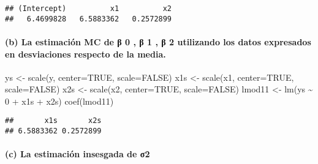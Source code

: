 \documentclass[
]{article}
\newenvironment{Shaded}{\begin{snugshade}}{\end{snugshade}}
\newcommand{\AttributeTok}[1]{\textcolor[rgb]{0.77,0.63,0.00}{#1}}
\newcommand{\ConstantTok}[1]{\textcolor[rgb]{0.00,0.00,0.00}{#1}}
\newcommand{\DecValTok}[1]{\textcolor[rgb]{0.00,0.00,0.81}{#1}}
\newcommand{\FunctionTok}[1]{\textcolor[rgb]{0.00,0.00,0.00}{#1}}
\newcommand{\NormalTok}[1]{#1}
\newcommand{\OtherTok}[1]{\textcolor[rgb]{0.56,0.35,0.01}{#1}}
\newcommand{\SpecialCharTok}[1]{\textcolor[rgb]{0.00,0.00,0.00}{#1}}
\begin{document}
\begin{verbatim}
## (Intercept)          x1          x2 
##   6.4699828   6.5883362   0.2572899
\end{verbatim}

\hypertarget{b-la-estimaciuxf3n-mc-de-ux3b2-0-ux3b2-1-ux3b2-2-utilizando-los-datos-expresados-en-desviaciones-respecto-de-la-media.}{%
\paragraph{(b) La estimación MC de β 0 , β 1 , β 2 utilizando los datos
expresados en desviaciones respecto de la
media.}\label{b-la-estimaciuxf3n-mc-de-ux3b2-0-ux3b2-1-ux3b2-2-utilizando-los-datos-expresados-en-desviaciones-respecto-de-la-media.}}

\begin{Shaded}
\begin{Highlighting}[]
\NormalTok{ys }\OtherTok{\textless{}{-}} \FunctionTok{scale}\NormalTok{(y, }\AttributeTok{center=}\ConstantTok{TRUE}\NormalTok{, }\AttributeTok{scale=}\ConstantTok{FALSE}\NormalTok{)}
\NormalTok{x1s }\OtherTok{\textless{}{-}} \FunctionTok{scale}\NormalTok{(x1, }\AttributeTok{center=}\ConstantTok{TRUE}\NormalTok{, }\AttributeTok{scale=}\ConstantTok{FALSE}\NormalTok{)}
\NormalTok{x2s }\OtherTok{\textless{}{-}} \FunctionTok{scale}\NormalTok{(x2, }\AttributeTok{center=}\ConstantTok{TRUE}\NormalTok{, }\AttributeTok{scale=}\ConstantTok{FALSE}\NormalTok{)}
\NormalTok{lmod11 }\OtherTok{\textless{}{-}} \FunctionTok{lm}\NormalTok{(ys }\SpecialCharTok{\textasciitilde{}} \DecValTok{0} \SpecialCharTok{+}\NormalTok{ x1s }\SpecialCharTok{+}\NormalTok{ x2s)}
\FunctionTok{coef}\NormalTok{(lmod11)}
\end{Highlighting}
\end{Shaded}

\begin{verbatim}
##       x1s       x2s 
## 6.5883362 0.2572899
\end{verbatim}

\hypertarget{c-la-estimaciuxf3n-insesgada-de-ux3c32}{%
\paragraph{(c) La estimación insesgada de
σ2}\label{c-la-estimaciuxf3n-insesgada-de-ux3c32}}

\begin{Shaded}
\end{Shaded}
\end{document}
